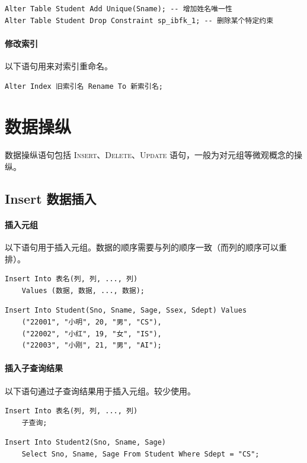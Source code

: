 \documentclass[UTF8]{ctexart}
\newcommand\kw[1]{\textsc{#1}} %
\begin{document}
\begin{lstlisting}[backgroundcolor=\color{white}]
Alter Table Student Add Unique(Sname); -- 增加姓名唯一性
Alter Table Student Drop Constraint sp_ibfk_1; -- 删除某个特定约束
\end{lstlisting}

\paragraph{修改索引} 以下语句用来对索引重命名。
\begin{lstlisting}
Alter Index 旧索引名 Rename To 新索引名;
\end{lstlisting}

\section{数据操纵}
数据操纵语句包括 \kw{Insert}、\kw{Delete}、\kw{Update} 语句，一般为对元组等微观概念的操纵。

\subsection{Insert 数据插入}
\paragraph{插入元组} 以下语句用于插入元组。数据的顺序需要与列的顺序一致（而列的顺序可以重排）。
\begin{lstlisting}
Insert Into 表名(列, 列, ..., 列)
    Values (数据, 数据, ..., 数据);
\end{lstlisting}

\begin{lstlisting}[backgroundcolor=\color{white}]
Insert Into Student(Sno, Sname, Sage, Ssex, Sdept) Values
    ("22001", "小明", 20, "男", "CS"),
    ("22002", "小红", 19, "女", "IS"),
    ("22003", "小刚", 21, "男", "AI");
\end{lstlisting}

\paragraph{插入子查询结果} 以下语句通过子查询结果用于插入元组。较少使用。
\begin{lstlisting}
Insert Into 表名(列, 列, ..., 列)
    子查询;
\end{lstlisting}

\begin{lstlisting}[backgroundcolor=\color{white}]
Insert Into Student2(Sno, Sname, Sage)
    Select Sno, Sname, Sage From Student Where Sdept = "CS";
\end{lstlisting}
\end{document}
